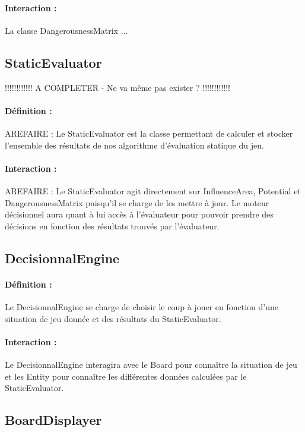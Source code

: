 			\paragraph{Interaction :}
			La classe DangerousnessMatrix ...

		\subsection*{StaticEvaluator}

			!!!!!!!!!!!! A COMPLETER - Ne va même pas exister ? !!!!!!!!!!!!
			\paragraph{Définition :}
			AREFAIRE : Le StaticEvaluator est la classe permettant de calculer et stocker l'ensemble des résultats de nos algorithme 
			d'évaluation statique du jeu.
			\paragraph{Interaction :}
			AREFAIRE : Le StaticEvaluator agit directement sur InfluenceArea, Potential et DangerousnessMatrix puisqu'il se charge 
			de les mettre à jour. Le moteur décisionnel aura quant à lui accès à l'évaluateur pour pouvoir prendre des décisions en fonction 
			des résultats trouvés par l'évaluateur.

		\subsection*{DecisionnalEngine}

			\paragraph{Définition :}
			Le DecisionnalEngine se charge de choisir le coup à jouer en fonction d'une situation de jeu donnée et des résultats 
			du StaticEvaluator.
			\paragraph{Interaction :}
			Le DecisionnalEngine interagira avec le Board pour connaître la situation de jeu et les Entity pour connaître les 
			différentes données calculées par le StaticEvaluator.

		\subsection*{BoardDisplayer}

